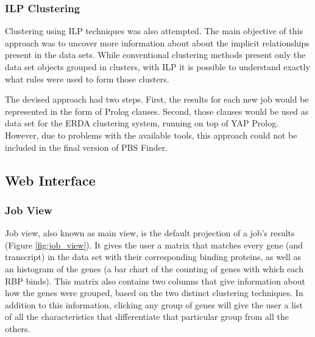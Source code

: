 \subsubsection*{ILP Clustering}

Clustering using ILP techniques was also attempted. The main objective of this
approach was to uncover more information about about the implicit relationships
present in the data sets. While conventional clustering methods present only the
data set objects grouped in clusters, with ILP it is possible to understand
exactly what rules were used to form those clusters.

The devised approach had two steps. First, the results for each new job would be
represented in the form of Prolog clauses. Second, those clauses would be used
as data set for the ERDA clustering system, running on top of YAP Prolog.
However, due to problems with the available tools, this approach could not be
included in the final version of PBS Finder.

\subsection{Web Interface}


\subsubsection*{Job View}

Job view, also known as main view, is the default projection of a job's results
(Figure \ref{fig:job_view}). It gives the user a matrix that matches every gene (and
transcript) in the data set with their corresponding binding proteins, as well
as an histogram of the genes (a bar chart of the counting of genes with which
each RBP binds). This matrix also contains two columns that give information
about how the genes were grouped, based on the two distinct clustering
techniques. In addition to this information,
clicking any group of genes will give the user a list of all the characteristics
that differentiate that particular group from all the others.

